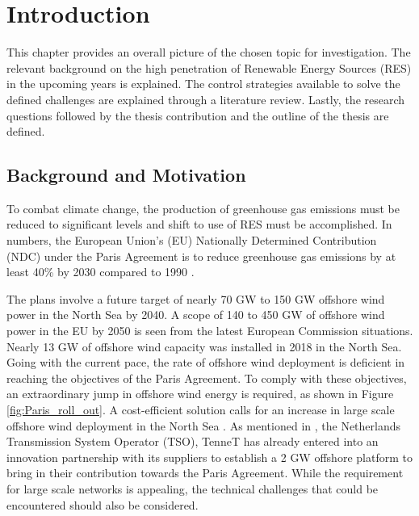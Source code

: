 \chapter{Introduction}\label{1}

This chapter provides an overall picture of the chosen topic for investigation. The relevant background on the high penetration of Renewable Energy Sources (\gls{RES}) in the upcoming years is explained. The control strategies available to solve the defined challenges are explained through a literature review. Lastly, the research questions followed by the thesis contribution and the outline of the thesis are defined. 

\section{Background and Motivation}\label{Background}

To combat climate change, the production of greenhouse gas emissions must be reduced to significant levels and shift to use of \gls{RES} must be accomplished. In numbers, the European Union's (\gls{EU}) Nationally Determined Contribution (NDC) under the Paris Agreement is to reduce greenhouse gas emissions by at least 40\% by 2030 compared to 1990 \cite{agreement2015unfccc}. 

The plans involve a future target of nearly 70 GW to 150 GW offshore wind power in the North Sea by 2040. A scope of 140 to 450 GW of offshore wind power in the \gls{EU} by 2050 is seen from the latest European Commission situations. Nearly 13 GW of offshore wind capacity was installed in 2018 in the North Sea. Going with the current pace, the rate of offshore wind deployment is deficient in reaching the objectives of the Paris Agreement. To comply with these objectives, an extraordinary jump in offshore wind energy is required, as shown in Figure \ref{fig:Paris_roll_out}. A cost-efficient solution calls for an increase in large scale offshore wind deployment in the North Sea \cite{noauthor_vision_nodate}. As mentioned in \cite{noauthor_tennet_2020}, the Netherlands Transmission System Operator (TSO), TenneT has already entered into an innovation partnership with its suppliers to establish a 2 GW offshore platform to bring in their contribution towards the Paris Agreement. While the requirement for large scale networks is appealing, the technical challenges that could be encountered should also be considered.  

